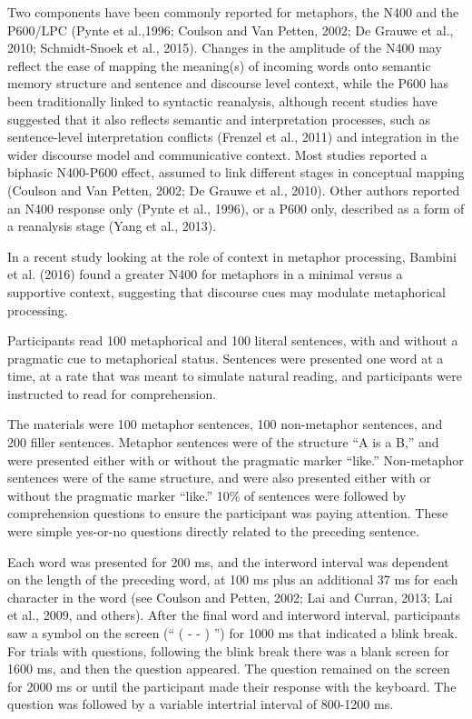 \documentclass[]{article}
\begin{document}
	Two components have been commonly reported for metaphors, the N400 and  the P600/LPC (Pynte et al.,1996; Coulson and Van Petten, 2002; De Grauwe et al., 2010; Schmidt-Snoek et al., 2015).
	Changes in the amplitude of the N400 may reflect the ease of mapping the meaning(s) of incoming words onto semantic memory structure and sentence and discourse level context, while the P600 has been traditionally linked to syntactic reanalysis, although recent studies have suggested that it also reflects semantic and interpretation processes, such as sentence-level interpretation conflicts (Frenzel et al., 2011) and integration in the wider discourse model and communicative context.
	Most studies reported a biphasic N400-P600 effect, assumed to link different stages in conceptual mapping (Coulson and Van Petten, 2002; De Grauwe et al., 2010). Other authors reported an N400 response only (Pynte et al., 1996), or a P600 only, described as a form of a reanalysis stage (Yang et al., 2013).
	
	In a recent study looking at the role of context in metaphor processing, Bambini et al. (2016) found a greater N400 for metaphors in a minimal versus a supportive context, suggesting that discourse cues may modulate metaphorical processing.
	
	Participants read 100 metaphorical and 100 literal sentences, with and without a pragmatic cue to metaphorical status.
	Sentences were presented one word at a time, at a rate that was meant to simulate natural reading, and participants were instructed to read for comprehension.
	
	The materials were 100 metaphor sentences, 100 non-metaphor sentences, and 200 filler sentences. Metaphor sentences were of the structure “A is a B,” and were presented either with or without the pragmatic marker “like.” 
	Non-metaphor sentences were of the same structure, and were also presented either with or without the pragmatic marker “like.”
	10\% of sentences were followed by comprehension questions to ensure the participant was paying attention. These were simple yes-or-no questions directly related to the preceding sentence.
	
	Each word was presented for 200 ms, and the interword interval was dependent on the length of the preceding word, at 100 ms plus an additional 37 ms for each character in the word (see Coulson and Petten, 2002; Lai and Curran, 2013; Lai et al., 2009, and others). After the final word and interword interval, participants saw a symbol on the screen (“ ( - - ) ”) for 1000 ms that indicated a blink break. For trials with questions, following the blink break there was a blank screen for 1600 ms, and then the question appeared. The question remained on the screen for 2000 ms or until the participant made their response with the keyboard. The question was followed by a variable intertrial interval of 800-1200 ms.
	
\end{document}

